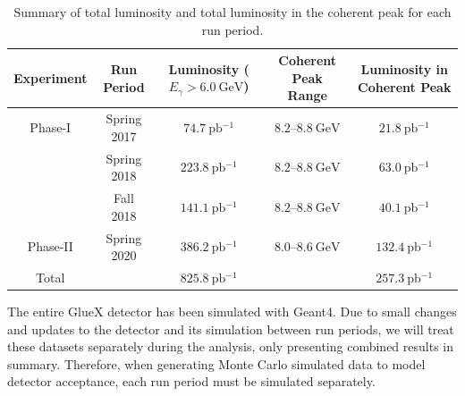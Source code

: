 \begin{table}
  \begin{center}
    \begin{tabular}{ccccc}\toprule
      Experiment & Run Period & Luminosity ($E_\gamma > \SI{6.0}{\giga\eV}$) & Coherent Peak Range & Luminosity in Coherent Peak \\\midrule
      Phase-I & Spring 2017 & $\SI{74.7}{\pico\barn^{-1}}$ & $8.2$--$\SI{8.8}{\giga\eV}$ & $\SI{21.8}{\pico\barn^{-1}}$ \\
              & Spring 2018 & $\SI{223.8}{\pico\barn^{-1}}$ & $8.2$--$\SI{8.8}{\giga\eV}$ & $\SI{63.0}{\pico\barn^{-1}}$ \\
              & Fall 2018 & $\SI{141.1}{\pico\barn^{-1}}$ & $8.2$--$\SI{8.8}{\giga\eV}$ & $\SI{40.1}{\pico\barn^{-1}}$ \\\midrule
      Phase-II & Spring 2020 & $\SI{386.2}{\pico\barn^{-1}}$ & $8.0$--$\SI{8.6}{\giga\eV}$ & $\SI{132.4}{\pico\barn^{-1}}$ \\\midrule
      Total & & $\SI{825.8}{\pico\barn^{-1}}$ & & $\SI{257.3}{\pico\barn^{-1}}$ \\\bottomrule
    \end{tabular}
    \caption{Summary of total luminosity and total luminosity in the coherent peak for each run period.}\label{tab:run-info}
  \end{center}
\end{table}

The entire GlueX detector has been simulated with Geant4. Due to small changes and updates to the detector and its simulation between run periods, we will treat these datasets separately during the analysis, only presenting combined results in summary. Therefore, when generating Monte Carlo simulated data to model detector acceptance, each run period must be simulated separately.
